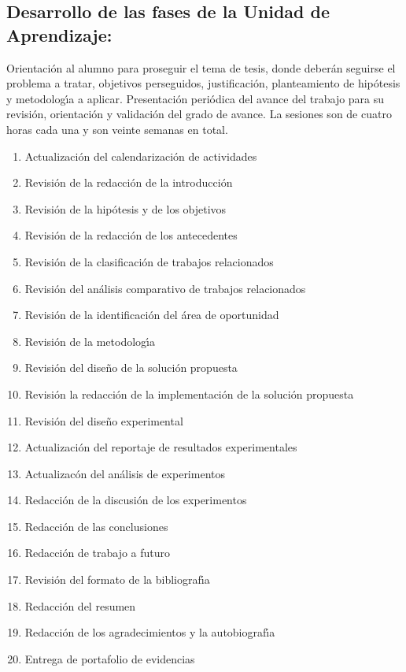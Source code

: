 \documentclass[10 pt]{article}
\begin{document}
\subsection{Desarrollo de las fases de la Unidad de Aprendizaje:}

Orientaci\'{o}n al alumno para proseguir el tema de tesis, donde deber\'{a}n
seguirse el problema a tratar, objetivos perseguidos, justificaci\'{o}n,
planteamiento de hip\'{o}tesis y metodolog\'{\i}a a aplicar.  Presentaci\'{o}n
peri\'{o}dica del avance del trabajo para su revisi\'{o}n, orientaci\'{o}n y
validaci\'{o}n del grado de avance. La sesiones son de cuatro horas cada
una y son veinte semanas en total.

\begin{enumerate}[itemsep=-2pt]
\item Actualizaci\'{o}n del calendarizaci\'{o}n de actividades
\item Revisi\'{o}n de la redacci\'{o}n de la introducci\'{o}n
\item Revisi\'{o}n de la hip\'{o}tesis y de los objetivos
\item Revisi\'{o}n de la redacci\'{o}n de los antecedentes
\item Revisi\'{o}n de la clasificaci\'{o}n de trabajos relacionados
\item Revisi\'{o}n del an\'{a}lisis comparativo de trabajos relacionados
\item Revisi\'{o}n de la identificaci\'{o}n del \'{a}rea de oportunidad
\item Revisi\'{o}n de la metodolog\'{\i}a
\item Revisi\'{o}n del dise\~{n}o de la soluci\'{o}n propuesta
\item Revisi\'{o}n la redacci\'{o}n de la implementaci\'{o}n de la soluci\'{o}n propuesta
\item Revisi\'{o}n del dise\~{n}o experimental
\item Actualizaci\'{o}n del reportaje de resultados experimentales
\item Actualizac\'{o}n del an\'{a}lisis de experimentos
\item Redacci\'{o}n de la discusi\'{o}n de los experimentos
\item Redacci\'{o}n de las conclusiones
\item Redacci\'{o}n de trabajo a futuro
\item Revisi\'{o}n del formato de la bibliograf\'{\i}a
\item Redacci\'{o}n del resumen
\item Redacci\'{o}n de los agradecimientos y la autobiograf\'{\i}a
\item Entrega de portafolio de evidencias
\end{enumerate}
\end{document}
